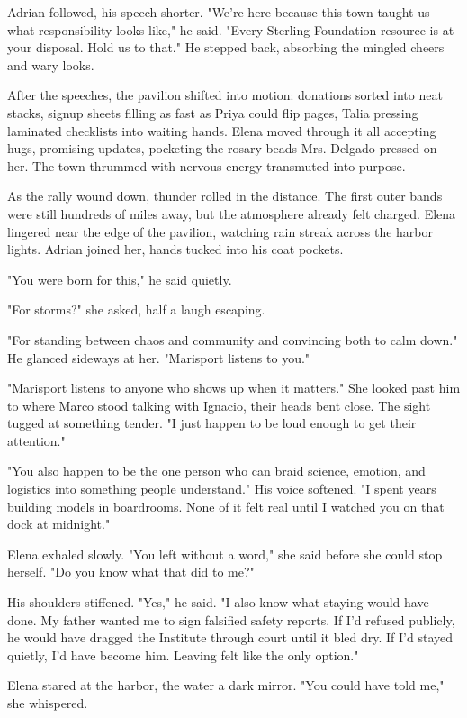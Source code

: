 Adrian followed, his speech shorter. "We're here because this town taught us what responsibility looks like," he said. "Every Sterling Foundation resource is at your disposal. Hold us to that." He stepped back, absorbing the mingled cheers and wary looks.

After the speeches, the pavilion shifted into motion: donations sorted into neat stacks, signup sheets filling as fast as Priya could flip pages, Talia pressing laminated checklists into waiting hands. Elena moved through it all accepting hugs, promising updates, pocketing the rosary beads Mrs. Delgado pressed on her. The town thrummed with nervous energy transmuted into purpose.

As the rally wound down, thunder rolled in the distance. The first outer bands were still hundreds of miles away, but the atmosphere already felt charged. Elena lingered near the edge of the pavilion, watching rain streak across the harbor lights. Adrian joined her, hands tucked into his coat pockets.

"You were born for this," he said quietly.

"For storms?" she asked, half a laugh escaping.

"For standing between chaos and community and convincing both to calm down." He glanced sideways at her. "Marisport listens to you."

"Marisport listens to anyone who shows up when it matters." She looked past him to where Marco stood talking with Ignacio, their heads bent close. The sight tugged at something tender. "I just happen to be loud enough to get their attention."

"You also happen to be the one person who can braid science, emotion, and logistics into something people understand." His voice softened. "I spent years building models in boardrooms. None of it felt real until I watched you on that dock at midnight."

Elena exhaled slowly. "You left without a word," she said before she could stop herself. "Do you know what that did to me?"

His shoulders stiffened. "Yes," he said. "I also know what staying would have done. My father wanted me to sign falsified safety reports. If I'd refused publicly, he would have dragged the Institute through court until it bled dry. If I'd stayed quietly, I'd have become him. Leaving felt like the only option."

Elena stared at the harbor, the water a dark mirror. "You could have told me," she whispered.

